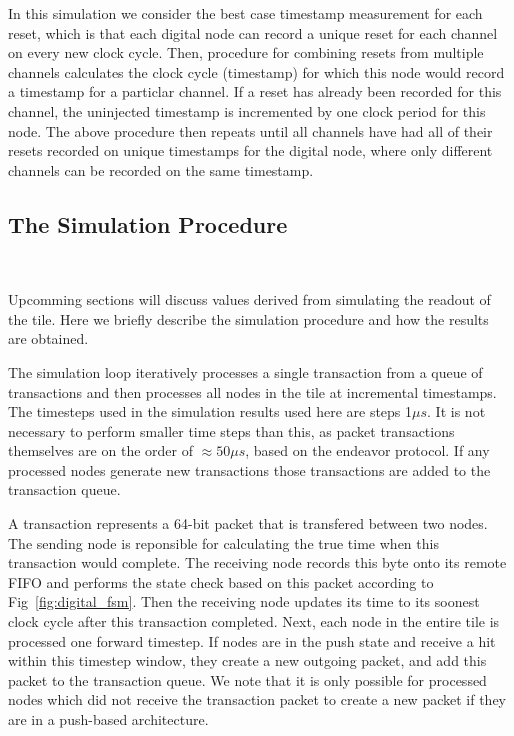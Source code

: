 In this simulation we consider the best case timestamp measurement for each reset, which is that each digital node can record a unique reset for each channel on every new clock cycle. 
Then, procedure for combining resets from multiple channels calculates the clock cycle (timestamp) for which this node would record a timestamp for a particlar channel.
If a reset has already been recorded for this channel, the uninjected timestamp is incremented by one clock period for this node.
The above procedure then repeats until all channels have had all of their resets recorded on unique timestamps for the digital node, where only different channels can be recorded on the same timestamp.

\subsection{The Simulation Procedure}~\label{sec:process}

Upcomming sections will discuss values derived from simulating the readout of the tile. 
Here we briefly describe the simulation procedure and how the results are obtained.

The simulation loop iteratively processes a single transaction from a queue of transactions and then processes all nodes in the tile at incremental timestamps.
The timesteps used in the simulation results used here are steps 1$\unit{\mu s}$.
It is not necessary to perform smaller time steps than this, as packet transactions themselves are on the order of $\approx 50 \unit{\mu s}$, based on the endeavor protocol.
If any processed nodes generate new transactions those transactions are added to the transaction queue.

A transaction represents a 64-bit packet that is transfered between two nodes.
The sending node is reponsible for calculating the true time when this transaction would complete.
The receiving node records this byte onto its remote FIFO and performs the state check based on this packet according to Fig~\ref{fig:digital_fsm}.
Then the receiving node updates its time to its soonest clock cycle after this transaction completed.
Next, each node in the entire tile is processed one forward timestep.
If nodes are in the push state and receive a hit within this timestep window, they create a new outgoing packet, and add this packet to the transaction queue.
We note that it is only possible for processed nodes which did not receive the transaction packet to create a new packet if they are in a push-based architecture. 

